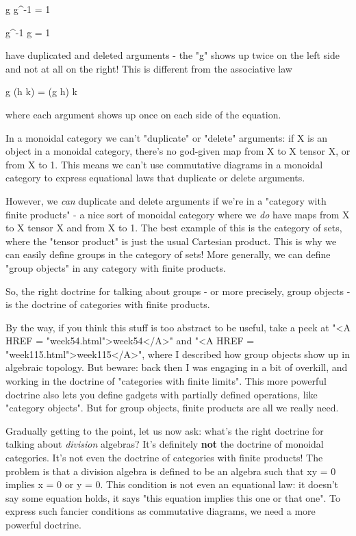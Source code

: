 g g^{-1} = 1

g^{-1} g = 1

have duplicated and deleted arguments - the "g" shows up twice
on the left side and not at all on the right!  This is different from
the associative law

g (h k) = (g h) k

where each argument shows up once on each side of the equation.

In a monoidal category we can't "duplicate" or
"delete" arguments: if X is an object in a monoidal category,
there's no god-given map from X to X tensor X, or from X to 1.  This
means we can't use commutative diagrams in a monoidal category to
express equational laws that duplicate or delete arguments.

However, we \emph{can} duplicate and delete arguments if we're in a
"category with finite products" - a nice sort of monoidal
category where we \emph{do} have maps from X to X tensor X and from X to 1.
The best example of this is the category of sets, where the "tensor
product" is just the usual Cartesian product.  This is why we can
easily define groups in the category of sets!  More generally, we can
define "group objects" in any category with finite products.

So, the right doctrine for talking about groups - or more precisely,
group objects - is the doctrine of categories with finite products.  

By the way, if you think this stuff is too abstract to be useful, take a
peek at "<A HREF = "week54.html">week54</A>" and "<A HREF
= "week115.html">week115</A>", where I described how group objects
show up in algebraic topology.  But beware: back then I was engaging in
a bit of overkill, and working in the doctrine of "categories with
finite limits".  This more powerful doctrine also lets you define
gadgets with partially defined operations, like "category
objects".  But for group objects, finite products are all we really
need.

Gradually getting to the point, let us now ask: what's the right
doctrine for talking about \emph{division} algebras?  It's definitely 
\textbf{not} the
doctrine of monoidal categories.  It's not even the doctrine of
categories with finite products!  The problem is that a division algebra
is defined to be an algebra such that xy = 0 implies x = 0 or y = 0.
This condition is not even an equational law: it doesn't say some
equation holds, it says "this equation implies this one or that one".
To express such fancier conditions as commutative diagrams, we need a
more powerful doctrine.  

